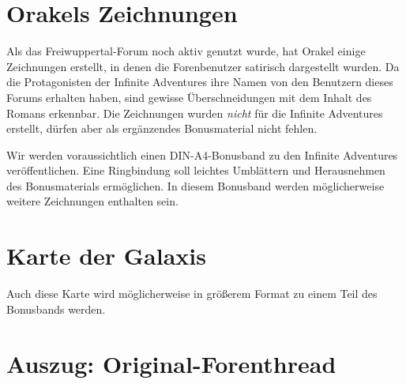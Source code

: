 \chapter{Orakels Zeichnungen}

Als das Freiwuppertal-Forum noch aktiv genutzt wurde, hat Orakel einige Zeichnungen erstellt, in denen die Forenbenutzer satirisch dargestellt wurden. Da die Protagonisten der Infinite Adventures ihre Namen von den Benutzern dieses Forums erhalten haben, sind gewisse Überschneidungen mit dem Inhalt des Romans erkennbar. Die Zeichnungen wurden \emph{nicht} für die Infinite Adventures erstellt, dürfen aber als ergänzendes Bonusmaterial nicht fehlen.

Wir werden voraussichtlich einen DIN-A4-Bonusband zu den Infinite Adventures veröffentlichen. Eine Ringbindung soll leichtes Umblättern und Herausnehmen des Bonusmaterials ermöglichen. In diesem Bonusband werden möglicherweise weitere Zeichnungen enthalten sein.




\chapter{Karte der Galaxis}

Auch diese Karte wird möglicherweise in größerem Format zu einem Teil des Bonusbands werden.




\chapter{Auszug: Original-Forenthread}

